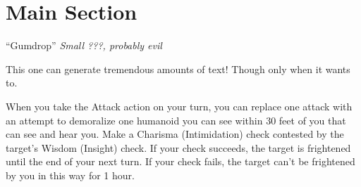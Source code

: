 

{\vspace{-3em}}

\section{Main Section}

\lipsum[1]

\newpage

\lipsum[1]

\newpage

\lipsum[1]

\newpage


\begin{monsterbox}{“Gumdrop”}
	\textit{Small ???, probably evil}\\
	\hline
	\basics[%
	armorclass = 13,
	hitpoints  = 33,
	speed      = 30 ft.
	]
	\hline
	\stats[
	STR = \stat{12}, %
	DEX = \stat{14},
	CON = \stat{10},
	INT = \stat{13},
	WIS = \stat{12},
	CHA = \stat{20}
	]
	\hline
	\details[%
	senses = {darkvision 60 ft., passive Perception 11},
	languages = {Common, Infernal, Sylvan, Draconic, Undercommon, Slaad, Spider (verbal and telepathic)},
	conditionimmunities = {charmed},
	]
	\begin{monsteraction}
		This one can generate tremendous amounts of text! Though only when it wants to.
	\end{monsteraction}
	\begin{monsteraction}
		When you take the Attack action on your turn, you can replace one attack with an attempt to demoralize one humanoid you can see within 30 feet of you that can see and hear you. Make a Charisma (Intimidation) check contested by the target's Wisdom (Insight) check. If your check succeeds, the target is frightened until the end of your next turn. If your check fails, the target can't be frightened by you in this way for 1 hour.
	\end{monsteraction}
	\begin{monsteraction}
	\end{monsteraction}
\end{monsterbox}

\clearpage
